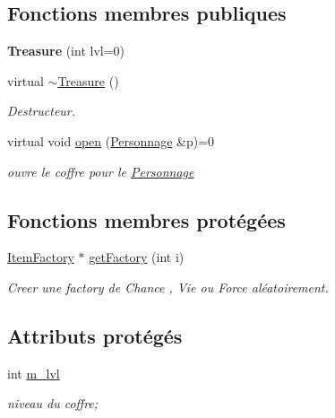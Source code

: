 \subsection*{Fonctions membres publiques}
\begin{DoxyCompactItemize}
\item 
\hypertarget{class_treasure_a967921026112b186111335c3e7ef025e}{{\bfseries Treasure} (int lvl=0)}\label{class_treasure_a967921026112b186111335c3e7ef025e}

\item 
\hypertarget{class_treasure_af8a5e946c1ada619c39d765d74a4d206}{virtual \hyperlink{class_treasure_af8a5e946c1ada619c39d765d74a4d206}{$\sim$\-Treasure} ()}\label{class_treasure_af8a5e946c1ada619c39d765d74a4d206}

\begin{DoxyCompactList}\small\item\em Destructeur. \end{DoxyCompactList}\item 
virtual void \hyperlink{class_treasure_ad30552aacaaf7ddab86f0c88147945fd}{open} (\hyperlink{class_personnage}{Personnage} \&p)=0
\begin{DoxyCompactList}\small\item\em ouvre le coffre pour le \hyperlink{class_personnage}{Personnage} \end{DoxyCompactList}\end{DoxyCompactItemize}
\subsection*{Fonctions membres protégées}
\begin{DoxyCompactItemize}
\item 
\hyperlink{class_item_factory}{Item\-Factory} $\ast$ \hyperlink{class_treasure_ab3a8e251ac3ce8524e142e7f93979eb6}{get\-Factory} (int i)
\begin{DoxyCompactList}\small\item\em Creer une factory de Chance , Vie ou Force aléatoirement. \end{DoxyCompactList}\end{DoxyCompactItemize}
\subsection*{Attributs protégés}
\begin{DoxyCompactItemize}
\item 
\hypertarget{class_treasure_a51144d1fb776d1c0612b87d3d8006aa8}{int \hyperlink{class_treasure_a51144d1fb776d1c0612b87d3d8006aa8}{m\-\_\-lvl}}\label{class_treasure_a51144d1fb776d1c0612b87d3d8006aa8}

\begin{DoxyCompactList}\small\item\em niveau du coffre; \end{DoxyCompactList}\end{DoxyCompactItemize}


